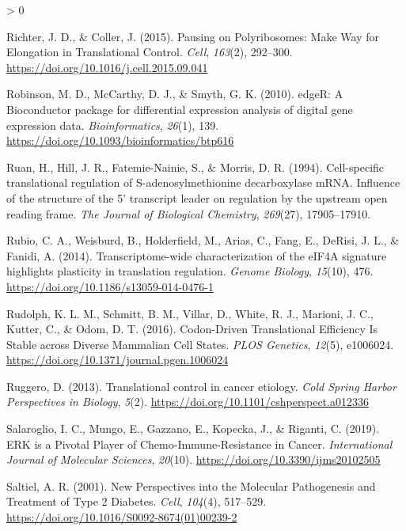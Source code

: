 \documentclass[
  12pt,
  openany]{book}
\newlength{\cslhangindent}
\newenvironment{CSLReferences}[2] %
 {%
  \setlength{\parindent}{0pt}
  \ifodd #1 \everypar{\setlength{\hangindent}{\cslhangindent}}\ignorespaces\fi
  \ifnum #2 > 0
  \setlength{\parskip}{#2\baselineskip}
  \fi
 }%
 {}
\begin{document}
\begin{CSLReferences}{1}{0}
\leavevmode\hypertarget{ref-Richter2015}{}%
Richter, J. D., \& Coller, J. (2015). Pausing on {Polyribosomes}: {Make Way} for {Elongation} in {Translational Control}. \emph{Cell}, \emph{163}(2), 292--300. \url{https://doi.org/10.1016/j.cell.2015.09.041}

\leavevmode\hypertarget{ref-Robinson2010}{}%
Robinson, M. D., McCarthy, D. J., \& Smyth, G. K. (2010). {edgeR}: A {Bioconductor} package for differential expression analysis of digital gene expression data. \emph{Bioinformatics}, \emph{26}(1), 139. \url{https://doi.org/10.1093/bioinformatics/btp616}

\leavevmode\hypertarget{ref-Ruan1994}{}%
Ruan, H., Hill, J. R., Fatemie-Nainie, S., \& Morris, D. R. (1994). Cell-specific translational regulation of {S}-adenosylmethionine decarboxylase {mRNA}. {Influence} of the structure of the 5' transcript leader on regulation by the upstream open reading frame. \emph{The Journal of Biological Chemistry}, \emph{269}(27), 17905--17910.

\leavevmode\hypertarget{ref-Rubio2014}{}%
Rubio, C. A., Weisburd, B., Holderfield, M., Arias, C., Fang, E., DeRisi, J. L., \& Fanidi, A. (2014). Transcriptome-wide characterization of the {eIF4A} signature highlights plasticity in translation regulation. \emph{Genome Biology}, \emph{15}(10), 476. \url{https://doi.org/10.1186/s13059-014-0476-1}

\leavevmode\hypertarget{ref-Rudolph2016}{}%
Rudolph, K. L. M., Schmitt, B. M., Villar, D., White, R. J., Marioni, J. C., Kutter, C., \& Odom, D. T. (2016). Codon-{Driven Translational Efficiency Is Stable} across {Diverse Mammalian Cell States}. \emph{PLOS Genetics}, \emph{12}(5), e1006024. \url{https://doi.org/10.1371/journal.pgen.1006024}

\leavevmode\hypertarget{ref-Ruggero2013}{}%
Ruggero, D. (2013). Translational control in cancer etiology. \emph{Cold Spring Harbor Perspectives in Biology}, \emph{5}(2). \url{https://doi.org/10.1101/cshperspect.a012336}

\leavevmode\hypertarget{ref-Salaroglio2019}{}%
Salaroglio, I. C., Mungo, E., Gazzano, E., Kopecka, J., \& Riganti, C. (2019). {ERK} is a {Pivotal Player} of {Chemo}-{Immune}-{Resistance} in {Cancer}. \emph{International Journal of Molecular Sciences}, \emph{20}(10). \url{https://doi.org/10.3390/ijms20102505}

\leavevmode\hypertarget{ref-Saltiel2001}{}%
Saltiel, A. R. (2001). New {Perspectives} into the {Molecular Pathogenesis} and {Treatment} of {Type} 2 {Diabetes}. \emph{Cell}, \emph{104}(4), 517--529. \url{https://doi.org/10.1016/S0092-8674(01)00239-2}


\end{CSLReferences}
\end{document}
